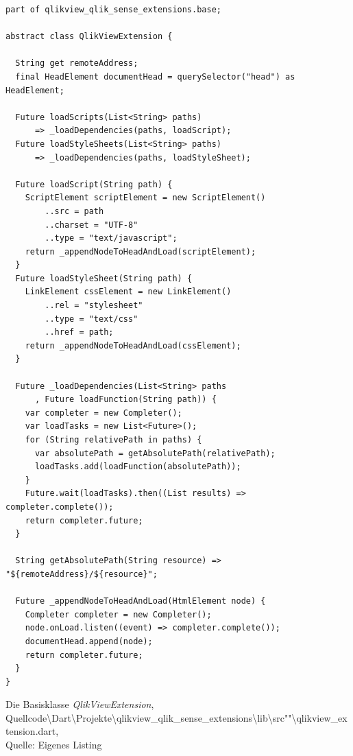 \begin{listing}[htbp]
\begin{verbatim}
part of qlikview_qlik_sense_extensions.base;

abstract class QlikViewExtension {

  String get remoteAddress;
  final HeadElement documentHead = querySelector("head") as HeadElement;

  Future loadScripts(List<String> paths) 
	  => _loadDependencies(paths, loadScript);
  Future loadStyleSheets(List<String> paths) 
	  => _loadDependencies(paths, loadStyleSheet);
  
  Future loadScript(String path) {
    ScriptElement scriptElement = new ScriptElement()
        ..src = path
        ..charset = "UTF-8"
        ..type = "text/javascript";
    return _appendNodeToHeadAndLoad(scriptElement);
  }
  Future loadStyleSheet(String path) {
    LinkElement cssElement = new LinkElement()
        ..rel = "stylesheet"
        ..type = "text/css"
        ..href = path;
    return _appendNodeToHeadAndLoad(cssElement);
  }  

  Future _loadDependencies(List<String> paths
	  , Future loadFunction(String path)) {
    var completer = new Completer();
    var loadTasks = new List<Future>();
    for (String relativePath in paths) {
      var absolutePath = getAbsolutePath(relativePath);
      loadTasks.add(loadFunction(absolutePath));
    }
    Future.wait(loadTasks).then((List results) => completer.complete());
    return completer.future;
  }

  String getAbsolutePath(String resource) => "${remoteAddress}/${resource}";
  
  Future _appendNodeToHeadAndLoad(HtmlElement node) {
    Completer completer = new Completer();
    node.onLoad.listen((event) => completer.complete());
    documentHead.append(node);
    return completer.future;
  }
}
\end{verbatim}
\caption[Die Basisklasse \textit{QlikViewExtension}]{Die Basisklasse \textit{QlikViewExtension}, \\Quellcode\textbackslash{}Dart\textbackslash{}Projekte\textbackslash{}qlikview\_qlik\_sense\_extensions\textbackslash{}lib\textbackslash{}src""\textbackslash{}qlikview\_extension.dart, \\Quelle: Eigenes Listing}
\label{lst:BasisklasseQlikViewExtension}
\end{listing}

